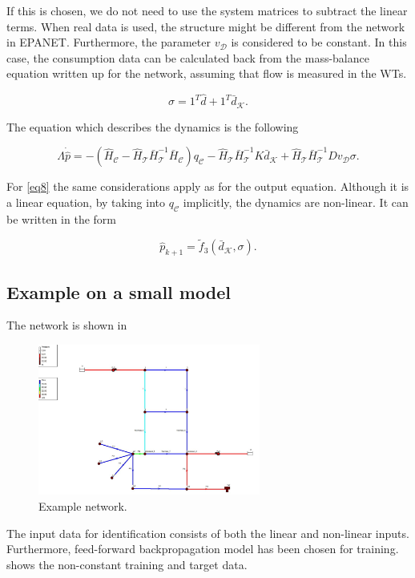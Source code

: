 If this is chosen, we do not need to use the system matrices to subtract the linear terms. When real data is used, the structure might be different from the network in EPANET. Furthermore, the parameter $v_{\mathcal{D}}$ is considered to be constant. In this case, the consumption data can be calculated back from the mass-balance equation written up for the network, assuming that flow is measured in the WTs. 

\begin{equation}
\label{eq7}
 \sigma = 1^T \hat{d} + 1^T \bar{d}_{\mathcal{K}}.
\end{equation}

The equation which describes the dynamics is the following

\begin{equation}
\label{eq8}
\Lambda \dot{\hat{p}} = - (\hat{H}_{\mathcal{C}} - \hat{H}_{\mathcal{T}} \bar{H}^{-1}_{\mathcal{T}}\bar{H}_{\mathcal{C}})  q_\mathcal{C}  - \hat{H}_{\mathcal{T}} \bar{H}^{-1}_{\mathcal{T}} K \bar{d}_{\mathcal{K}} + \hat{H}_{\mathcal{T}} \bar{H}^{-1}_{\mathcal{T}} D v_{\mathcal{D}} \sigma .
\end{equation}

 For \eqref{eq8} the same considerations apply as for the output equation. Although it is a linear equation, by taking into $q_\mathcal{C}$ implicitly, the dynamics are non-linear. It can be written in the form

\begin{equation}
\label{eq9}
\hat{p}_{k+1} = \tilde{f}_3(\bar{d}_{\mathcal{K}}, \sigma).
\end{equation}

\vspace{-6mm}
\subsection{Example on a small model}

The network is shown in 
\vspace{-3mm}
\begin{figure}[H]
\centering
\includegraphics[width=0.65\textwidth]{discussion_files/example1}
% 
\caption{Example network.}
\label{fig:example1}
\end{figure}
\vspace{-8mm}
The input data for identification consists of both the linear and non-linear inputs. Furthermore, feed-forward backpropagation model has been chosen for training.  shows the non-constant training and target data. 


